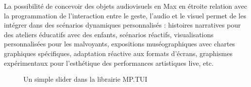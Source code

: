 \noindent La possibilité de concevoir des objets audiovisuels en Max en étroite relation avec la programmation de l'interaction entre le geste, l'audio et le visuel permet de les intégrer dans des scénarios dynamiques personnalisés : histoires narratives pour des ateliers éducatifs avec des enfants, scénarios réactifs, visualisations personnalisées pour les malvoyants, expositions muséographiques avec chartes graphiques spécifiques, adaptation réactive aux formats d'écrans, graphismes expérimentaux pour l'esthétique des performances artistiques live, etc.
\begin{figure}[!htbp]
	\caption{Un simple slider dans la librairie MP.TUI}
	\label{fig:visual_representation:mp.TUI.slider}
\end{figure}


